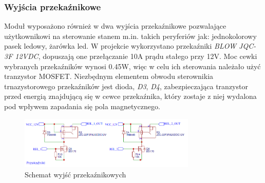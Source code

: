 \documentclass[12pt, eng, twoside, openany, final]{mgr}
\begin{document}
            \subsubsection{Wyjścia przekaźnikowe}
            Moduł wyposażono również w dwa wyjścia przekaźnikowe pozwalające użytkownikowi na sterowanie stanem m.in. takich peryferiów jak: jednokolorowy pasek ledowy, żarówka led. W projekcie wykorzystano przekaźniki \emph{BLOW JQC-3F 12VDC}, dopuszają one przełączanie 10A prądu stałego przy 12V.
            Moc cewki wybranych przekaźników wynosi 0.45W, więc w celu ich sterowania należało użyć tranzystor MOSFET. Niezbędnym elementem obwodu sterownikia trnazystorowego przekaźników jest dioda, \emph{D3}, \emph{D4}, zabezpieczająca tranzystor przed energią znajdującą się w cewce przekaźnika, który zostaje z niej wydalona pod wpływem zapadania się pola magnetycznego.
                \begin{figure}[H]
                \begin{center}
                    \includegraphics[width=0.75\textwidth]{przekazniki.png}
                    \caption{Schemat wyjść przekaźnikowych}
                \end{center}
                \end{figure}
\end{document}
